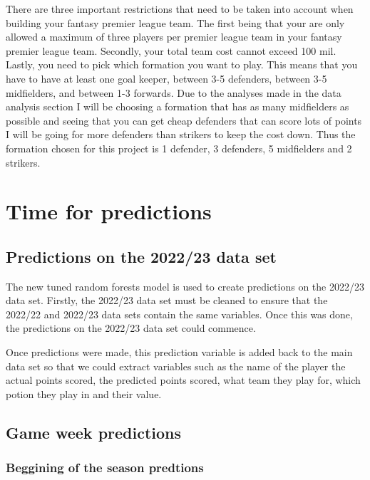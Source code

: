 \documentclass[11pt,preprint, authoryear]{elsarticle}
\numberwithin{equation}{section}
\numberwithin{figure}{section}
\numberwithin{table}{section}
\begin{document}
There are three important restrictions that need to be taken into
account when building your fantasy premier league team. The first being
that your are only allowed a maximum of three players per premier league
team in your fantasy premier league team. Secondly, your total team cost
cannot exceed 100 mil. Lastly, you need to pick which formation you want
to play. This means that you have to have at least one goal keeper,
between 3-5 defenders, between 3-5 midfielders, and between 1-3
forwards. Due to the analyses made in the data analysis section I will
be choosing a formation that has as many midfielders as possible and
seeing that you can get cheap defenders that can score lots of points I
will be going for more defenders than strikers to keep the cost down.
Thus the formation chosen for this project is 1 defender, 3 defenders, 5
midfielders and 2 strikers.

\hypertarget{time-for-predictions}{%
\section{Time for predictions}\label{time-for-predictions}}

\hypertarget{predictions-on-the-202223-data-set}{%
\subsection{Predictions on the 2022/23 data
set}\label{predictions-on-the-202223-data-set}}

The new tuned random forests model is used to create predictions on the
2022/23 data set. Firstly, the 2022/23 data set must be cleaned to
ensure that the 2022/22 and 2022/23 data sets contain the same
variables. Once this was done, the predictions on the 2022/23 data set
could commence.

Once predictions were made, this prediction variable is added back to
the main data set so that we could extract variables such as the name of
the player the actual points scored, the predicted points scored, what
team they play for, which potion they play in and their value.

\hypertarget{game-week-predictions}{%
\subsection{Game week predictions}\label{game-week-predictions}}

\hypertarget{beggining-of-the-season-predtions}{%
\subsubsection{Beggining of the season
predtions}\label{beggining-of-the-season-predtions}}
\end{document}
